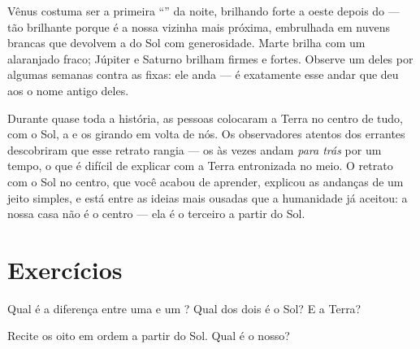 \begin{example}\label{ex:g4:solar-system:wanderers}
Vênus costuma ser a primeira ``'' da noite, brilhando forte a
oeste depois do  --- tão brilhante porque é a nossa vizinha
mais próxima, embrulhada em nuvens brancas que devolvem a  do Sol
com generosidade. Marte brilha com um alaranjado fraco; Júpiter e
Saturno brilham firmes e fortes. Observe um deles por algumas semanas
contra as  fixas: ele anda --- é exatamente esse andar que
deu aos  o nome antigo deles.
\end{example}

\begin{remark}\label{rem:g4:solar-system:history}
Durante quase toda a história, as pessoas colocaram a Terra no centro
de tudo, com o Sol, a  e os  girando em volta de nós. Os
observadores atentos dos errantes descobriram que esse retrato
rangia --- os  às vezes andam \emph{para trás} por um tempo,
o que é difícil de explicar com a Terra entronizada no meio. O
retrato com o Sol no centro, que você acabou de aprender, explicou as
andanças de um jeito simples, e está entre as ideias mais ousadas que
a humanidade já aceitou: a nossa casa não é o centro --- ela é o
terceiro  a partir do Sol.
\end{remark}

\section{Exercícios}

\begin{exercise}[$\star$]\label{exo:g4:solar-system:1}
Qual é a diferença entre uma  e um ? Qual dos dois é o
Sol? E a Terra?
\end{exercise}

\begin{exercise}[$\star$]\label{exo:g4:solar-system:2}
Recite os oito  em ordem a partir do Sol. Qual é o nosso?
\end{exercise}

